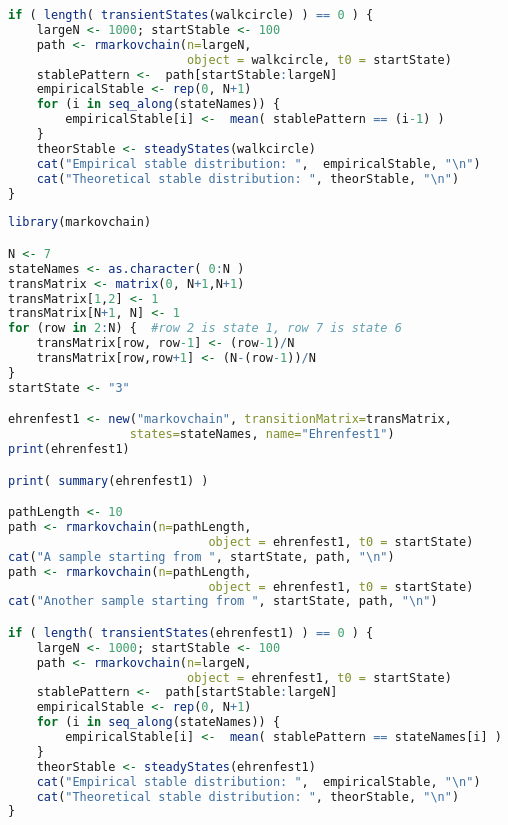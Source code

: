 \begin{description}
\begin{lstlisting}[language=R]
if ( length( transientStates(walkcircle) ) == 0 ) {
    largeN <- 1000; startStable <- 100
    path <- rmarkovchain(n=largeN,
                         object = walkcircle, t0 = startState)
    stablePattern <-  path[startStable:largeN]
    empiricalStable <- rep(0, N+1)
    for (i in seq_along(stateNames)) { 
        empiricalStable[i] <-  mean( stablePattern == (i-1) )
    }
    theorStable <- steadyStates(walkcircle)
    cat("Empirical stable distribution: ",  empiricalStable, "\n")
    cat("Theoretical stable distribution: ", theorStable, "\n")
}
\end{lstlisting}



\begin{lstlisting}[language=R]
library(markovchain)

N <- 7
stateNames <- as.character( 0:N )
transMatrix <- matrix(0, N+1,N+1)
transMatrix[1,2] <- 1
transMatrix[N+1, N] <- 1
for (row in 2:N) {  #row 2 is state 1, row 7 is state 6
    transMatrix[row, row-1] <- (row-1)/N
    transMatrix[row,row+1] <- (N-(row-1))/N
}
startState <- "3"

ehrenfest1 <- new("markovchain", transitionMatrix=transMatrix,
                 states=stateNames, name="Ehrenfest1")
print(ehrenfest1)

print( summary(ehrenfest1) )

pathLength <- 10 
path <- rmarkovchain(n=pathLength,
                            object = ehrenfest1, t0 = startState)
cat("A sample starting from ", startState, path, "\n")
path <- rmarkovchain(n=pathLength,
                            object = ehrenfest1, t0 = startState)
cat("Another sample starting from ", startState, path, "\n")

if ( length( transientStates(ehrenfest1) ) == 0 ) {
    largeN <- 1000; startStable <- 100
    path <- rmarkovchain(n=largeN,
                         object = ehrenfest1, t0 = startState)
    stablePattern <-  path[startStable:largeN]
    empiricalStable <- rep(0, N+1)
    for (i in seq_along(stateNames)) { 
        empiricalStable[i] <-  mean( stablePattern == stateNames[i] )
    }
    theorStable <- steadyStates(ehrenfest1)
    cat("Empirical stable distribution: ",  empiricalStable, "\n")
    cat("Theoretical stable distribution: ", theorStable, "\n")
}

  
\end{lstlisting}


\end{description}
